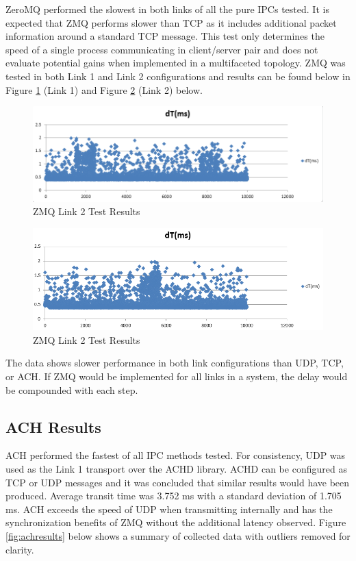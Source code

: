ZeroMQ performed the slowest in both links of all the pure IPCs tested. It is expected that ZMQ performs slower than TCP as it includes additional packet information around a standard TCP message. This test only determines the speed of a single process communicating in client/server pair and does not evaluate potential gains when implemented in a multifaceted topology. ZMQ was tested in both Link 1 and Link 2 configurations and results can be found below in Figure \ref{fig:ZMQ L1 results} (Link 1) and Figure \ref{fig:ZMQ L2 results} (Link 2) below.

\begin{figure}[thpb]
 \centering
 \includegraphics[width=1.0\columnwidth]{./images/zmq2udp.png}
  \caption{ZMQ Link 2 Test Results}  
  \label{fig:ZMQ L1 results}
\end{figure} 

\begin{figure}[thpb]
 \centering
 \includegraphics[width=1.0\columnwidth]{./images/udp2zmq.png}
  \caption{ZMQ Link 2 Test Results}  
  \label{fig:ZMQ L2 results}
\end{figure} 

The data shows slower performance in both link configurations than UDP, TCP, or ACH. If ZMQ would be implemented for all links in a system, the delay would be compounded with each step.

\subsection{ACH Results}

ACH performed the fastest of all IPC methods tested. For consistency, UDP was used as the Link 1 transport over the ACHD library. ACHD can be configured as TCP or UDP messages and it was concluded that similar results would have been produced. Average transit time was 3.752 ms with a standard deviation of 1.705 ms. ACH exceeds the speed of UDP when transmitting internally and has the synchronization benefits of ZMQ without the additional latency observed. Figure \ref{fig:achresults} below shows a summary of collected data with outliers removed for clarity.

